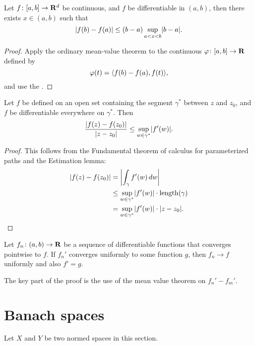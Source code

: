 \begin{namedthm}
    Let $f\colon [a,b] \to \mathbf{R}^d$ be continuous, and $f$ be differentiable in $(a,b)$, then there exists $x \in (a,b)$ such that \[
        \lvert f(b) - f(a) \rvert \leq (b-a) \sup_{a< x < b} \lvert b - a \rvert.
    \]
\end{namedthm}
\begin{proof}
    Apply the ordinary mean-value theorem to the continuous $\varphi\colon [a,b] \to \mathbf{R}$ defined by \[
        \varphi(t) = \langle f(b) - f(a), f(t) \rangle,
    \] and use the .
\end{proof}

\begin{namedthm}
    Let $f$ be defined on an open set containing the segment $\gamma^*$ between $z$ and $z_0$, and $f$ be differentiable everywhere on $\gamma^*$. Then \[
        \frac{\lvert f(z) - f(z_0) \rvert}{\lvert z - z_0 \rvert} \leq \sup_{w\in \gamma^*}\lvert f'(w) \rvert.
    \]
\end{namedthm}
\begin{proof}
    This follows from the Fundamental theorem of calculus for parameterized paths and the Estimation lemma: \begin{align*}
         \lvert f(z) - f(z_0) \rvert & = \biggl\vert \int_\gamma f'(w)\,dw\biggr\vert \\ & \leq \sup_{w\in \gamma^*} \lvert f'(w) \rvert\cdot \operatorname{length}(\gamma) \\ & = \sup_{w\in \gamma^*} \lvert f'(w) \rvert\cdot \lvert z - z_0 \rvert. \qedhere
    \end{align*}
\end{proof}

\begin{namedthm}
    Let $f_n \colon (a,b)\to \mathbf{R}$ be a sequence of differentiable functions that converges pointwise to $f$. If $f_n'$ converges uniformly to some function $g$, then $f_n\to f$ uniformly and also $f' = g$.
\end{namedthm}
The key part of the proof is the use of the mean value theorem on $f_n' - f_m'$. 

\section{Banach spaces}
Let $X$ and $Y$ be two normed spaces in this section.

